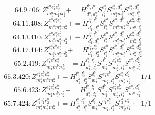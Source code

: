\documentclass[letterpaper,10pt,fleqn,leqno,onecolumn]{article}
\begin{document}
\begin{equation} \;\;\;\;\;\;  64.9.406: Z^{e_{1}^{a}e_{1}^{b}e_{2}^{b}}_{m_{1}^{a}m_{1}^{b}m_{2}^{b}}+=H^{l_{1}^{b},l_{1}^{a}}_{d_{1}^{a},d_{1}^{b}}S^{e_{1}^{b}}_{l_{1}^{b}}S^{e_{2}^{b},d_{1}^{a}}_{m_{1}^{a}m_{1}^{b}}S^{e_{1}^{a},d_{1}^{b}}_{m_{2}^{b},l_{1}^{a}} \end{equation}
\begin{equation} \;\;\;\;\;\;  64.11.408: Z^{e_{1}^{a}e_{1}^{b}e_{2}^{b}}_{m_{1}^{a}m_{1}^{b}m_{2}^{b}}+=H^{l_{1}^{a},l_{1}^{b}}_{d_{1}^{b},d_{1}^{a}}S^{e_{1}^{a}}_{l_{1}^{a}}S^{e_{1}^{b},d_{1}^{b}}_{m_{1}^{b}m_{2}^{b}}S^{e_{2}^{b},d_{1}^{a}}_{m_{1}^{a},l_{1}^{b}} \end{equation}
\begin{equation} \;\;\;\;\;\;  64.13.410: Z^{e_{1}^{a}e_{1}^{b}e_{2}^{b}}_{m_{1}^{a}m_{1}^{b}m_{2}^{b}}+=H^{l_{1}^{a},l_{1}^{b}}_{d_{1}^{a},d_{1}^{b}}S^{e_{1}^{a}}_{l_{1}^{a}}S^{e_{1}^{b},d_{1}^{a}}_{m_{1}^{a}m_{1}^{b}}S^{e_{2}^{b},d_{1}^{b}}_{m_{2}^{b},l_{1}^{b}} \end{equation}
\begin{equation} \;\;\;\;\;\;  64.17.414: Z^{e_{1}^{a}e_{1}^{b}e_{2}^{b}}_{m_{1}^{a}m_{1}^{b}m_{2}^{b}}+=H^{l_{1}^{a},l_{2}^{a}}_{d_{1}^{a},d_{2}^{a}}S^{e_{1}^{a}}_{l_{1}^{a}}S^{e_{1}^{b},d_{1}^{a}}_{m_{1}^{a}m_{1}^{b}}S^{e_{2}^{b},d_{2}^{a}}_{m_{2}^{b},l_{2}^{a}} \end{equation}
\begin{equation} \;\;\;\;\;\;  65.2.419: Z^{e_{1}^{a}e_{1}^{b}e_{2}^{b}}_{m_{1}^{a}m_{1}^{b}m_{2}^{b}}+=H^{l_{1}^{b},l_{2}^{b}}_{d_{1}^{b},d_{2}^{b}}S^{d_{1}^{b}}_{m_{1}^{b}}S^{e_{1}^{b}e_{2}^{b}}_{m_{2}^{b},l_{1}^{b}}S^{e_{1}^{a},d_{2}^{b}}_{m_{1}^{a},l_{2}^{b}} \end{equation}
\begin{equation} \;\;\;\;\;\;  65.3.420: Z^{e_{1}^{a}e_{1}^{b}e_{2}^{b}}_{m_{1}^{a}m_{1}^{b}m_{2}^{b}}+=H^{l_{1}^{b},l_{2}^{b}}_{d_{1}^{b},d_{2}^{b}}S^{d_{1}^{b}}_{m_{1}^{b}}S^{e_{1}^{a}e_{1}^{b}}_{m_{1}^{a},l_{1}^{b}}S^{e_{2}^{b},d_{2}^{b}}_{m_{2}^{b},l_{2}^{b}}\cdot -1/1 \end{equation}
\begin{equation} \;\;\;\;\;\;  65.6.423: Z^{e_{1}^{a}e_{1}^{b}e_{2}^{b}}_{m_{1}^{a}m_{1}^{b}m_{2}^{b}}+=H^{l_{1}^{b},l_{1}^{a}}_{d_{1}^{b},d_{1}^{a}}S^{d_{1}^{b}}_{m_{1}^{b}}S^{e_{1}^{b}e_{2}^{b}}_{m_{2}^{b},l_{1}^{b}}S^{e_{1}^{a},d_{1}^{a}}_{m_{1}^{a},l_{1}^{a}} \end{equation}
\begin{equation} \;\;\;\;\;\;  65.7.424: Z^{e_{1}^{a}e_{1}^{b}e_{2}^{b}}_{m_{1}^{a}m_{1}^{b}m_{2}^{b}}+=H^{l_{1}^{b},l_{1}^{a}}_{d_{1}^{b},d_{1}^{a}}S^{d_{1}^{b}}_{m_{1}^{b}}S^{e_{1}^{a}e_{1}^{b}}_{m_{1}^{a},l_{1}^{b}}S^{e_{2}^{b},d_{1}^{a}}_{m_{2}^{b},l_{1}^{a}}\cdot -1/1 \end{equation}
\end{document}
